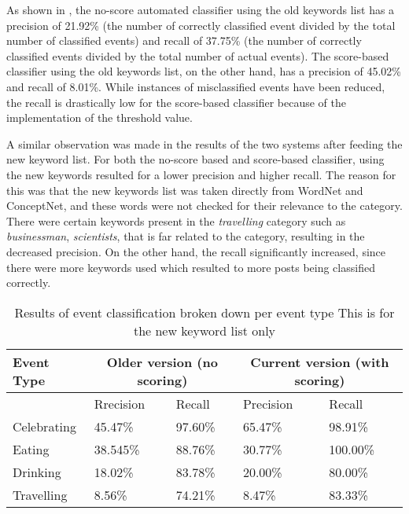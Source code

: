 As shown in , the no-score automated classifier using the old keywords list has a precision of 21.92\% (the number of correctly classified event divided by the total number of classified events) and recall of 37.75\% (the number of correctly classified events divided by the total number of actual events). The score-based classifier using the old keywords list, on the other hand, has a precision of 45.02\% and recall of 8.01\%. While instances of misclassified events have been reduced, the recall is drastically low for the score-based classifier because of the implementation of the threshold value. 

A similar observation was made in the results of the two systems after feeding the new keyword list. For both the no-score based and score-based classifier, using the new keywords resulted for a lower precision and higher recall. The reason for this was that the new keywords list was taken directly from WordNet and ConceptNet, and these words were not checked for their relevance to the category. There were certain keywords present in the \textit{travelling} category such as \textit{businessman}, \textit{scientists}, that is far related to the category, resulting in the decreased precision. On the other hand, the recall significantly increased, since there were more keywords used which resulted to more posts being classified correctly.
\clearpage
\begin{table}[ph!]   %
	\centering
	\caption{Results of event classification broken down per event type This is for the new keyword list only} \vspace{0.25em}
	\begin{tabular}{|p{1in}|p{1in}|p{1in}|p{1in}|p{1in}|} \hline
		\centering Event Type & \multicolumn{2}{|c|}{Older version (no scoring)} &\multicolumn{2}{|c|}{Current version (with scoring)} \\ \cline{2-2}\hline
		& Rrecision & Recall & Precision &Recall\\\hline
		Celebrating & 45.47\% & 97.60\% & 65.47\% & 98.91\% \\ \hline
		Eating & 38.545\% & 88.76\% & 30.77\% & 100.00\% \\ \hline
		Drinking & 18.02\% & 83.78\%  & 20.00\% & 80.00\% \\ \hline
		Travelling & 8.56\% & 74.21\%  & 8.47\% & 83.33\% \\ \hline
	\end{tabular}
	\label{tab:eventclassification-results}
\end{table}

